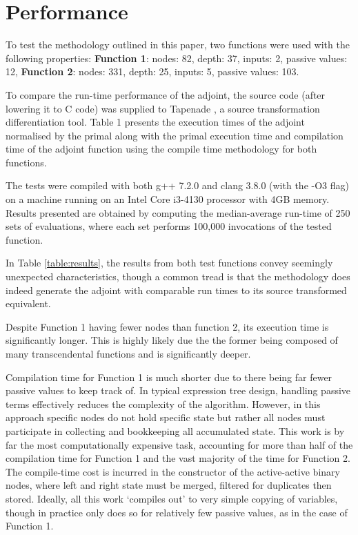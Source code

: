 \documentclass[a4paper,10pt]{article}
\begin{document}
\section{Performance}
To test the methodology outlined in this paper, two functions were used with the following properties:
\textbf{Function 1}: nodes: 82, depth: 37, inputs: 2, passive values: 12,
\textbf{Function 2}: nodes: 331, depth: 25, inputs: 5, passive values: 103.

To compare the run-time performance of the adjoint, the source code (after lowering it to C code) was supplied to Tapenade \citep{TapenadeRef13}, a source
transformation differentiation tool. Table 1 presents the execution times of the adjoint normalised by the primal along
with the primal execution time and compilation time of the adjoint function using the compile time methodology for both functions.

The tests were compiled with both g++ 7.2.0 and clang 3.8.0 (with the -O3 flag) on a machine running on an
Intel Core i3-4130 processor with 4GB memory. Results presented are obtained by computing the median-average run-time of 250 sets
of evaluations, where each set performs 100,000 invocations of the tested function.

In Table \ref{table:results}, the results from both test functions convey seemingly unexpected characteristics, though a common tread is that the methodology does indeed generate the adjoint with comparable run times to its source transformed equivalent.

Despite Function 1 having fewer nodes than function 2, its execution time is significantly longer. This is highly likely due the the former being composed of many transcendental functions and is significantly deeper.

Compilation time for Function 1 is much shorter due to there being far fewer passive values to keep track of. In typical expression tree design, handling passive terms effectively reduces the complexity of the algorithm. However, in this approach specific nodes do not hold specific state but rather all nodes must participate in collecting and bookkeeping all accumulated state. This work is by far the most computationally expensive task, accounting for more than half of the compilation time for Function 1 and the vast majority of the time for Function 2. The compile-time cost is incurred in the constructor of the active-active binary nodes, where left and right state must be merged, filtered for duplicates then stored. Ideally, all this work `compiles out' to very simple copying of variables, though in practice only does so for relatively few passive values, as in the case of Function 1.
\end{document}

